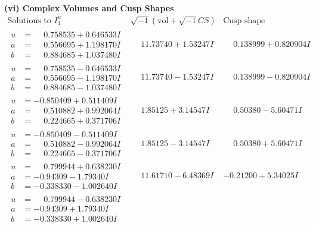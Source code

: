 \documentclass[1p]{elsarticle_modified}
\theoremstyle{definition}
\newcommand{\I}{\sqrt{-1}}
\begin{document}
\newpage\flushleft \textbf{(vi) Complex Volumes and Cusp Shapes}
$$\begin{array}{c|c|c}  
\text{Solutions to }I^u_{1}& \I (\text{vol} + \sqrt{-1}CS) & \text{Cusp shape}\\
 \hline 
\begin{aligned}
u &= \phantom{-}0.758535 + 0.646533 I \\
a &= \phantom{-}0.556695 + 1.198170 I \\
b &= \phantom{-}0.884685 + 1.037480 I\end{aligned}
 & \phantom{-}11.73740 + 1.53247 I & \phantom{-}0.138999 + 0.820904 I \\ \hline\begin{aligned}
u &= \phantom{-}0.758535 - 0.646533 I \\
a &= \phantom{-}0.556695 - 1.198170 I \\
b &= \phantom{-}0.884685 - 1.037480 I\end{aligned}
 & \phantom{-}11.73740 - 1.53247 I & \phantom{-}0.138999 - 0.820904 I \\ \hline\begin{aligned}
u &= -0.850409 + 0.511409 I \\
a &= \phantom{-}0.510882 + 0.992064 I \\
b &= \phantom{-}0.224665 + 0.371706 I\end{aligned}
 & \phantom{-}1.85125 + 3.14547 I & \phantom{-}0.50380 - 5.60471 I \\ \hline\begin{aligned}
u &= -0.850409 - 0.511409 I \\
a &= \phantom{-}0.510882 - 0.992064 I \\
b &= \phantom{-}0.224665 - 0.371706 I\end{aligned}
 & \phantom{-}1.85125 - 3.14547 I & \phantom{-}0.50380 + 5.60471 I \\ \hline\begin{aligned}
u &= \phantom{-}0.799944 + 0.638230 I \\
a &= -0.94309 - 1.79340 I \\
b &= -0.338330 - 1.002640 I\end{aligned}
 & \phantom{-}11.61710 - 6.48369 I & -0.21200 + 5.34025 I \\ \hline\begin{aligned}
u &= \phantom{-}0.799944 - 0.638230 I \\
a &= -0.94309 + 1.79340 I \\
b &= -0.338330 + 1.002640 I\end{aligned}

\end{array}$$
\end{document}
